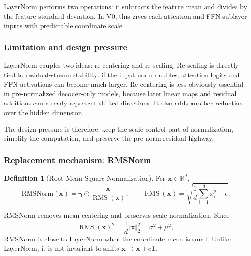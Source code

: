 \documentclass[11pt,a4paper]{article}
\theoremstyle{definition}
\newtheorem{definition}{Definition}[section]
\theoremstyle{plain}
\newcommand{\vx}{\bm{x}}
\newcommand{\reals}{\mathbb{R}}
\DeclareMathOperator{\RMS}{RMS}
\begin{document}
LayerNorm performs two operations: it subtracts the feature mean and divides by the feature standard deviation. In V0, this gives each attention and FFN sublayer inputs with predictable coordinate scale.

\subsubsection{Limitation and design pressure}

LayerNorm couples two ideas: re-centering and re-scaling. Re-scaling is directly tied to residual-stream stability: if the input norm doubles, attention logits and FFN activations can become much larger. Re-centering is less obviously essential in pre-normalized decoder-only models, because later linear maps and residual additions can already represent shifted directions. It also adds another reduction over the hidden dimension.

The design pressure is therefore: keep the scale-control part of normalization, simplify the computation, and preserve the pre-norm residual highway.

\subsubsection{Replacement mechanism: RMSNorm}

\begin{definition}[Root Mean Square Normalization]
For $\vx\in\reals^d$,
\begin{equation}\label{eq:rmsnorm}
    \mathrm{RMSNorm}(\vx)=
    \bm{\gamma}\odot\frac{\vx}{\RMS(\vx)},
    \qquad
    \RMS(\vx)=\sqrt{\frac{1}{d}\sum_{i=1}^{d}x_i^2+\epsilon}.
\end{equation}
\end{definition}

RMSNorm removes mean-centering and preserves scale normalization. Since
\begin{equation}\label{eq:rms_variance_relation}
    \RMS(\vx)^2=\frac{1}{d}\Vert\vx\Vert_2^2=\sigma^2+\mu^2,
\end{equation}
RMSNorm is close to LayerNorm when the coordinate mean is small. Unlike LayerNorm, it is not invariant to shifts $\vx\mapsto\vx+c\mathbf{1}$.
\end{document}
